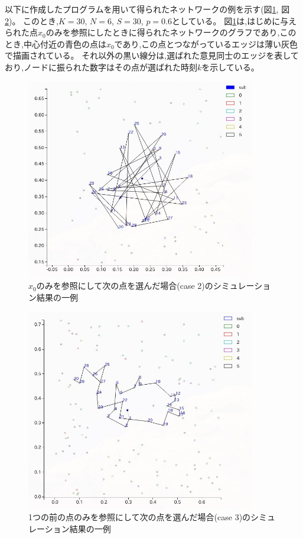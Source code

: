 以下に作成したプログラムを用いて得られたネットワークの例を示す(図\ref{fig:f9}, 図\ref{fig:f10})。
このとき,$K=30$, $N=6$, $S=30$, $p=0.6$としている。
図\ref{fig:f9}は,はじめに与えられた点$x_{0}$のみを参照にしたときに得られたネットワークのグラフであり,このとき,中心付近の青色の点は$x_{0}$であり,この点とつながっているエッジは薄い灰色で描画されている。
それ以外の黒い線分は,選ばれた意見同士のエッジを表しており,ノードに振られた数字はその点が選ばれた時刻$k$を示している。
\begin{figure}[H]
    \begin{center}
        \includegraphics[width=10cm]{../simple3/case_2.jpg}
        \caption{$x_{0}$のみを参照にして次の点を選んだ場合(case 2)のシミュレーション結果の一例}
        \label{fig:f9}
    \end{center}
\end{figure}
\begin{figure}[H]
    \begin{center}
        \includegraphics[width=10cm]{../simple3/case_3.jpg}
        \caption{1つの前の点のみを参照にして次の点を選んだ場合(case 3)のシミュレーション結果の一例}
        \label{fig:f10}
    \end{center}
\end{figure}
